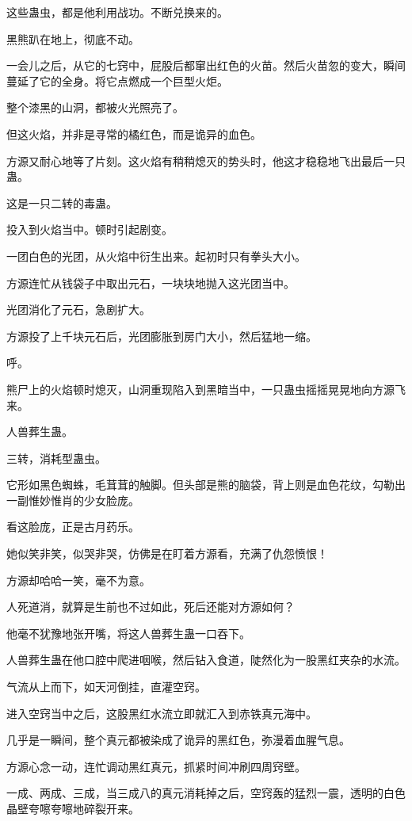 \begin{this_body}
这些蛊虫，都是他利用战功。不断兑换来的。

黑熊趴在地上，彻底不动。

一会儿之后，从它的七窍中，屁股后都窜出红色的火苗。然后火苗忽的变大，瞬间蔓延了它的全身。将它点燃成一个巨型火炬。

整个漆黑的山洞，都被火光照亮了。

但这火焰，并非是寻常的橘红色，而是诡异的血色。

方源又耐心地等了片刻。这火焰有稍稍熄灭的势头时，他这才稳稳地飞出最后一只蛊。

这是一只二转的毒蛊。

投入到火焰当中。顿时引起剧变。

一团白色的光团，从火焰中衍生出来。起初时只有拳头大小。

方源连忙从钱袋子中取出元石，一块块地抛入这光团当中。

光团消化了元石，急剧扩大。

方源投了上千块元石后，光团膨胀到房门大小，然后猛地一缩。

呼。

熊尸上的火焰顿时熄灭，山洞重现陷入到黑暗当中，一只蛊虫摇摇晃晃地向方源飞来。

人兽葬生蛊。

三转，消耗型蛊虫。

它形如黑色蜘蛛，毛茸茸的触脚。但头部是熊的脑袋，背上则是血色花纹，勾勒出一副惟妙惟肖的少女脸庞。

看这脸庞，正是古月药乐。

她似笑非笑，似哭非哭，仿佛是在盯着方源看，充满了仇怨愤恨！

方源却哈哈一笑，毫不为意。

人死道消，就算是生前也不过如此，死后还能对方源如何？

他毫不犹豫地张开嘴，将这人兽葬生蛊一口吞下。

人兽葬生蛊在他口腔中爬进咽喉，然后钻入食道，陡然化为一股黑红夹杂的水流。

气流从上而下，如天河倒挂，直灌空窍。

进入空窍当中之后，这股黑红水流立即就汇入到赤铁真元海中。

几乎是一瞬间，整个真元都被染成了诡异的黑红色，弥漫着血腥气息。

方源心念一动，连忙调动黑红真元，抓紧时间冲刷四周窍壁。

一成、两成、三成，当三成八的真元消耗掉之后，空窍轰的猛烈一震，透明的白色晶壁夸嚓夸嚓地碎裂开来。


\end{this_body}
